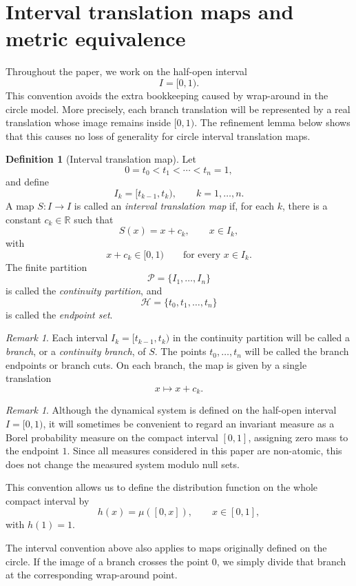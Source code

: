 \documentclass[11pt]{amsart}
\theoremstyle{plain}
\theoremstyle{definition}
\newtheorem{definition}[theorem]{Definition}
\theoremstyle{remark}
\newtheorem{remark}[theorem]{Remark}
\newcommand{\cP}{\mathcal P}
\newcommand{\cH}{\mathcal H}
\begin{document}
\section{Interval translation maps and metric equivalence}

Throughout the paper, we work on the half-open interval
\[
I=[0,1).
\]
This convention avoids the extra bookkeeping caused by wrap-around in the
circle model. More precisely, each branch translation will be represented by
a real translation whose image remains inside \([0,1)\). The refinement lemma
below shows that this causes no loss of generality for circle interval
translation maps.

\begin{definition}[Interval translation map]
	Let
	\[
	0=t_0<t_1<\cdots<t_n=1,
	\]
	and define
	\[
	I_k=[t_{k-1},t_k),
	\qquad k=1,\ldots,n.
	\]
	A map \(S:I\to I\) is called an \emph{interval translation map} if, for each
	\(k\), there is a constant \(c_k\in\mathbb{R}\) such that
	\[
	S(x)=x+c_k,
	\qquad x\in I_k,
	\]
	with
	\[
	x+c_k\in[0,1)
	\qquad\text{for every }x\in I_k.
	\]
	The finite partition
	\[
	\cP=\{I_1,\ldots,I_n\}
	\]
	is called the \emph{continuity partition}, and
	\[
	\cH=\{t_0,t_1,\ldots,t_n\}
	\]
	is called the \emph{endpoint set}.
\end{definition}

\begin{remark}
	Each interval \(I_k=[t_{k-1},t_k)\) in the continuity partition will be
	called a \emph{branch}, or a \emph{continuity branch}, of \(S\). The points
	\(t_0,\ldots,t_n\) will be called the branch endpoints or branch cuts. On
	each branch, the map is given by a single translation
	\[
	x\longmapsto x+c_k.
	\]
\end{remark}

\begin{remark}
	Although the dynamical system is defined on the half-open interval
	\(I=[0,1)\), it will sometimes be convenient to regard an invariant measure
	as a Borel probability measure on the compact interval \([0,1]\), assigning
	zero mass to the endpoint \(1\). Since all measures considered in this paper
	are non-atomic, this does not change the measured system modulo null sets.
	
	This convention allows us to define the distribution function on the whole
	compact interval by
	\[
	h(x)=\mu([0,x]),
	\qquad x\in[0,1],
	\]
	with \(h(1)=1\).
\end{remark}

The interval convention above also applies to maps originally defined on the
circle. If the image of a branch crosses the point \(0\), we simply divide
that branch at the corresponding wrap-around point.
\end{document}
